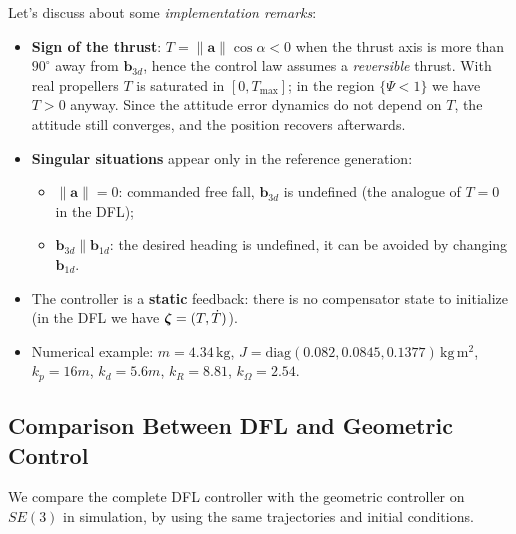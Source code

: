 \documentclass[10pt, a4paper]{report}
\begin{document}
\noindent Let's discuss about some \textit{implementation remarks}:
\begin{itemize}
    \item \textbf{Sign of the thrust}: $T=\|\mathbf a\|\cos\alpha<0$ when the thrust axis is more than $90^\circ$ away from $\mathbf b_{3d}$, hence the control law assumes a \textit{reversible} thrust. With real propellers $T$ is saturated in $[0,T_{\max}]$; in the region $\{\Psi<1\}$ we have $T>0$ anyway. Since the attitude error dynamics do not depend on $T$, the attitude still converges, and the position recovers afterwards.
    \item \textbf{Singular situations} appear only in the reference generation:\begin{itemize}
        \item $\|\mathbf a\|=0$: commanded free fall, $\mathbf b_{3d}$ is undefined (the analogue of $T=0$ in the DFL);
        \item $\mathbf b_{3d}\parallel\mathbf b_{1d}$: the desired heading is undefined, it can be avoided by changing $\mathbf b_{1d}$.
    \end{itemize}
    \item The controller is a \textbf{static} feedback: there is no compensator state to initialize (in the DFL we have ${\boldsymbol{\zeta}}=(T,\dot T)$).
    \item Numerical example: $m=4.34\,\text{kg}$, $J=\text{diag}(0.082,0.0845,0.1377)\,\text{kg}\,\text{m}^2$, $k_p=16m$, $k_d=5.6m$, $k_R=8.81$, $k_\Omega=2.54$.
\end{itemize}
\subsection{Comparison Between DFL and Geometric Control}
We compare the complete DFL controller with the geometric controller on $SE(3)$ in simulation, by using the same trajectories and initial conditions.\bigskip
\end{document}
